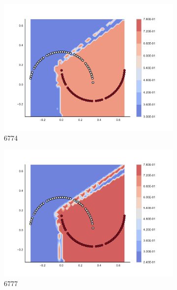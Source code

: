 \begin{figure}[h]
\begin{subfigure}[b]{0.09\textwidth}
    \includegraphics[clip, trim=2.35cm 1.75cm 4.5cm 0cm,width=\textwidth]{img/convergence/6774.pdf}
    \caption{6774}
    \label{fig:convergence_6774}
\end{subfigure}
%
\begin{subfigure}[b]{0.09\textwidth}
    \includegraphics[clip, trim=2.35cm 1.75cm 4.5cm 0cm,width=\textwidth]{img/convergence/6777.pdf}
    \caption{6777}
    \label{fig:convergence_6777}
\end{subfigure}
%
\begin{subfigure}[b]{0.09\textwidth}

\end{subfigure}
\end{figure}
